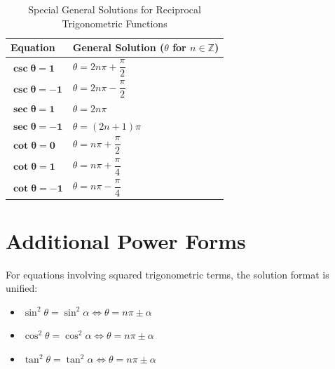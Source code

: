 \documentclass[11pt, a4paper]{article}
\begin{document}
\begin{table}[htbp]
\centering
\caption{Special General Solutions for Reciprocal Trigonometric Functions}
\vspace{0.2cm}
\begin{tabular}{p{4.5cm} p{10cm}}
\toprule
\textbf{Equation} & \textbf{General Solution} ($\theta$ for $n \in \mathbb{Z}$) \\
\midrule
$\boldsymbol{\csc\theta = 1}$ & $\theta = 2n\pi + \dfrac{\pi}{2}$ \\
$\boldsymbol{\csc\theta = -1}$ & $\theta = 2n\pi - \dfrac{\pi}{2}$ \\
\midrule
$\boldsymbol{\sec\theta = 1}$ & $\theta = 2n\pi$ \\
$\boldsymbol{\sec\theta = -1}$ & $\theta = (2n + 1)\pi$ \\
\midrule
$\boldsymbol{\cot\theta = 0}$ & $\theta = n\pi + \dfrac{\pi}{2}$ \\
$\boldsymbol{\cot\theta = 1}$ & $\theta = n\pi + \dfrac{\pi}{4}$ \\
$\boldsymbol{\cot\theta = -1}$ & $\theta = n\pi - \dfrac{\pi}{4}$ \\
\bottomrule
\end{tabular}
\end{table}

\section{Additional Power Forms}
For equations involving squared trigonometric terms, the solution format is unified:

\begin{itemize}
    \item $\sin^2\theta = \sin^2\alpha \iff \theta = n\pi \pm \alpha$
    \item $\cos^2\theta = \cos^2\alpha \iff \theta = n\pi \pm \alpha$
    \item $\tan^2\theta = \tan^2\alpha \iff \theta = n\pi \pm \alpha$
\end{itemize}
\end{document}
